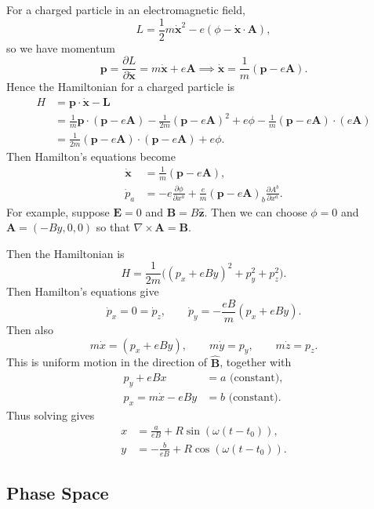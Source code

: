 \documentclass[12pt]{article}
\begin{document}
\begin{exbox}
	For a charged particle in an electromagnetic field,
	\[
	L = \frac{1}{2}m \mathbf{\dot x}^2 - e (\phi - \mathbf{\dot x} \cdot \mathbf{A}),
	\]
	so we have momentum
	\[
	\mathbf{p} = \frac{\partial L}{\partial \mathbf{\dot x}} = m \mathbf{\dot x} + e \mathbf{A} \implies \mathbf{\dot x} = \frac{1}{m}(\mathbf{p} - e \mathbf{A}).
	\]
	Hence the Hamiltonian for a charged particle is
	\begin{align*}
		H &= \mathbf{p} \cdot \mathbf{\dot x} - \mathbf{L} \\
		  &= \frac{1}{m} \mathbf{p} \cdot (\mathbf{p} - e \mathbf{A}) - \frac{1}{2m} (\mathbf{p} - e \mathbf{A})^2 + e \phi - \frac{1}{m}(\mathbf{p} - e \mathbf{A})\cdot (e \mathbf{A}) \\
		  &= \frac{1}{2m} (\mathbf{p} - e \mathbf{A}) \cdot (\mathbf{p} - e \mathbf{A}) + e \phi.
	\end{align*}
	Then Hamilton's equations become
	\begin{align*}
		\mathbf{\dot x} &= \frac{1}{m}(\mathbf{p} - e \mathbf{A}), \\
		\dot p_a &= - e \frac{\partial \phi}{\partial x^a} + \frac{e}{m} (\mathbf{p} - e \mathbf{A})_b \frac{\partial A^b}{\partial x^a}.
	\end{align*}
	For example, suppose $\mathbf{E} = 0$ and $\mathbf{B} = B \mathbf{\hat z}$. Then we can choose $\phi = 0$ and $\mathbf{A} = (-By, 0, 0)$ so that $\nabla \times \mathbf{A} = \mathbf{B}$.

	Then the Hamiltonian is
	\[
	H = \frac{1}{2m}\bigl((p_x + e By)^2 + p_y^2 + p_z^2\bigr).
	\]
	Then Hamilton's equations give
	\[
	\dot p_x = 0 = \dot p_z, \qquad \dot p_y = - \frac{eB}{m}(p_x + e By).
	\]
	Then also
	\[
	m \dot x = (p_x + e By), \qquad m \dot y = p_y, \qquad m \dot z = p_z.
	\]
	This is uniform motion in the direction of $\mathbf{\hat B}$, together with
	\begin{align*}
		p_y + eBx &= a \text{ (constant)}, \\
		p_x  = m \dot x - e By &= b \text{ (constant)}.
	\end{align*}
	Thus solving gives
	\begin{align*}
		x &= \frac{a}{eB} + R \sin(\omega(t - t_0)), \\
		y &= - \frac{b}{eB} + R \cos (\omega(t - t_0)).
	\end{align*}
\end{exbox}

\subsection{Phase Space}
\label{sub:phase_space}
\end{document}
